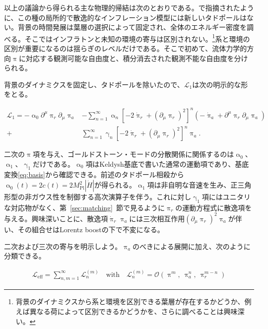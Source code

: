\documentclass[a4paper,11pt]{ltjsarticle}
\numberwithin{equation}{section}
\newcommand{\Sec}[1]{Sec.~\ref{#1}}
\renewcommand{\Sec}[1]{第~\ref{#1}~節}
\begin{document}
以上の議論から得られる主な物理的帰結は次のとおりである。\cite{LopezNacir:2011kk}で指摘されたように、この種の局所的で散逸的なインフレーション模型には新しいタドポールはない。背景の時間発展は葉層の選択によって固定され、全体のエネルギー密度を調べる。そこではインフラトンと未知の環境の寄与は区別されない。\footnote{背景のダイナミクスから系と環境を区別できる葉層が存在するかどうか、例えば異なる荷によって区別できるかどうかを、さらに調べることは興味深い。}系と環境の区別が重要になるのは揺らぎのレベルだけである。そこで初めて、流体力学的方向$\uppi$に対応する観測可能な自由度と、積分消去された観測不能な自由度を分けられる。

背景のダイナミクスを固定し、タドポールを除いたので、$\mathcal{L}_1$は次の明示的な形をとる。

\begin{align}
        \mathcal{L}_1 = - \upalpha_0 \partial^\mu \uppi_{r} \partial_\mu \uppi_{a} &-\sum_{n=1}^\infty \upalpha_n \left[-2 \dot{\uppi}_{r} + \left( \partial_\mu \uppi_{r}\right)^2\right]^{n}\left(-\dot{\uppi}_{a} + \partial^\mu \uppi_{r} \partial_\mu \uppi_{a}\right) \nonumber \\
        +& \sum_{n=1}^\infty \upgamma_n \left[-2 \dot{\uppi}_{r} + \left( \partial_\mu \uppi_{r}\right)^2\right]^n\uppi_{a}.
    \end{align}

二次の$\uppi$項を与え、ゴールドストーン・モードの分散関係に関係するのは$\upalpha_0$、$\upalpha_1$、$\upgamma_1$だけである\cite{Hongo:2018ant}。$\upalpha_0$項はKeldysh基底で書いた通常の運動項であり、基底変換\eqref{eq:basis}から確認できる。前述のタドポール相殺から$\upalpha_0(t)=2c(t)=2M_{\mathrm{Pl}}^2|\dot H|$が得られる。$\upalpha_1$項は非自明な音速を生み、正三角形型の非ガウス性を制御する高次演算子を伴う\cite{Cheung:2007st}。これに対し$\upgamma_1$項にはユニタリな対応物がなく、\Sec{sec:matching}で見るように$\uppi_r$の運動方程式に散逸項を与える。興味深いことに、散逸項$\dot{\uppi}_r\uppi_a$には三次相互作用$(\partial_\mu\uppi_r)^2\uppi_a$が伴い\cite{LopezNacir:2011kk}、その組合せはLorentz boostの下で不変になる。

二次および三次の寄与を明示しよう。$\uppi_a$のべきによる展開に加え、次のように分類できる。

\begin{align}
        \mathcal{L}_{\mathrm{eff}} = \sum_{n,m=1}^\infty  \mathcal{L}^{(m)}_n \quad\mathrm{with}\quad \mathcal{L}^{(m)}_n = \mathcal{O}(\uppi^m,~\uppi_{a}^n,~ \uppi_r^{m-n})
    \end{align}
\end{document}
